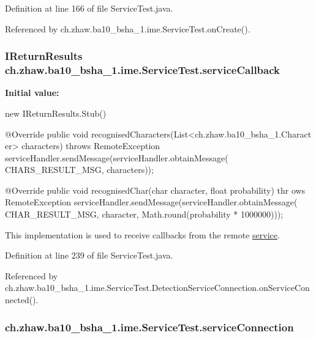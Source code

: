 Definition at line 166 of file ServiceTest.java.

Referenced by ch.zhaw.ba10\_\-bsha\_\-1.ime.ServiceTest.onCreate().\hypertarget{classch_1_1zhaw_1_1ba10__bsha__1_1_1ime_1_1ServiceTest_a1f4c0d2cd1ee8a21b0864daf0a0ef6c9}{
\subsubsection[{serviceCallback}]{\setlength{\rightskip}{0pt plus 5cm}IReturnResults {\bf ch.zhaw.ba10\_\-bsha\_\-1.ime.ServiceTest.serviceCallback}}}
\label{classch_1_1zhaw_1_1ba10__bsha__1_1_1ime_1_1ServiceTest_a1f4c0d2cd1ee8a21b0864daf0a0ef6c9}
{\bfseries Initial value:}
\begin{DoxyCode}
 new IReturnResults.Stub() {
        
                @Override
                public void recognisedCharacters(List<ch.zhaw.ba10_bsha_1.Charact
      er> characters) throws RemoteException {
                        serviceHandler.sendMessage(serviceHandler.obtainMessage(
      CHARS_RESULT_MSG, characters));
                }

                @Override
                public void recognisedChar(char character, float probability) thr
      ows RemoteException {
                        serviceHandler.sendMessage(serviceHandler.obtainMessage(
      CHAR_RESULT_MSG, character, Math.round(probability * 1000000)));
                }
    }
\end{DoxyCode}
This implementation is used to receive callbacks from the remote \hyperlink{namespacech_1_1zhaw_1_1ba10__bsha__1_1_1service}{service}. 

Definition at line 239 of file ServiceTest.java.

Referenced by ch.zhaw.ba10\_\-bsha\_\-1.ime.ServiceTest.DetectionServiceConnection.onServiceConnected().\hypertarget{classch_1_1zhaw_1_1ba10__bsha__1_1_1ime_1_1ServiceTest_ac2a420e14076a26d93ed433d75633b12}{
\subsubsection[{serviceConnection}]{ {\bf ch.zhaw.ba10\_\-bsha\_\-1.ime.ServiceTest.serviceConnection}}}
\label{classch_1_1zhaw_1_1ba10__bsha__1_1_1ime_1_1ServiceTest_ac2a420e14076a26d93ed433d75633b12}


